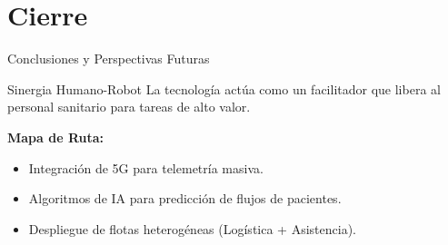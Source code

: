 \section{Cierre}
\begin{frame}{Conclusiones y Perspectivas Futuras}
    \begin{exampleblock}{Sinergia Humano-Robot}
        La tecnología actúa como un facilitador que libera al personal sanitario para tareas de alto valor.
    \end{exampleblock}
    
    \vspace{0.4cm}
    \textbf{Mapa de Ruta:}
    \begin{itemize}
        \item[$\rightarrow$] Integración de 5G para telemetría masiva.
        \item[$\rightarrow$] Algoritmos de IA para predicción de flujos de pacientes.
        \item[$\rightarrow$] Despliegue de flotas heterogéneas (Logística + Asistencia).
    \end{itemize}
\end{frame}
